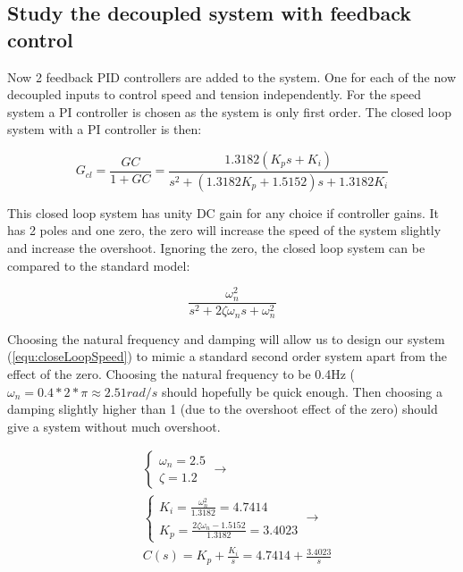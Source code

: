 \documentclass[a4paper, titlepage]{article}
\begin{document}
\subsection{Study the decoupled system with feedback control}
Now 2 feedback PID controllers are added to the system.
One for each of the now decoupled inputs to control speed and tension independently.
For the speed system a PI controller is chosen as the system is only first order.
The closed loop system with a PI controller is then:

\begin{equation}
G_{cl} = \frac{GC}{1 + GC} = \frac{1.3182(K_ps+K_i)}{s^2 + (1.3182K_p+1.5152)s + 1.3182K_i}
\label{equ:closeLoopSpeed}
\end{equation}

This closed loop system has unity DC gain for any choice if controller gains.
It has 2 poles and one zero, the zero will increase the speed of the system slightly and increase the overshoot.
Ignoring the zero, the closed loop system can be compared to the standard model:

\begin{equation}
\frac{\omega_n^2}{s^2 + 2\zeta\omega_ns + \omega_n^2}
\end{equation}

Choosing the natural frequency and damping will allow us to design our system (\ref{equ:closeLoopSpeed}) to mimic a standard second order system apart from the effect of the zero.
Choosing the natural frequency to be 0.4Hz ($\omega_n = 0.4*2*\pi \approx 2.51rad/s$ should hopefully be quick enough.
Then choosing a damping slightly higher than 1 (due to the overshoot effect of the zero) should give a system without much overshoot.

\begin{equation}
\begin{split}
&\begin{cases}
\omega_n = 2.5 \\ \zeta = 1.2
\end{cases} \rightarrow \\
&\begin{cases}
K_i = \frac{\omega_n^2}{1.3182} = 4.7414 \\
K_p = \frac{2\zeta\omega_n - 1.5152}{1.3182} = 3.4023
\end{cases} \rightarrow \\
&C(s) = K_p + \frac{K_i}{s} = 4.7414 + \frac{3.4023}{s}
\end{split}
\end{equation}
\end{document}
